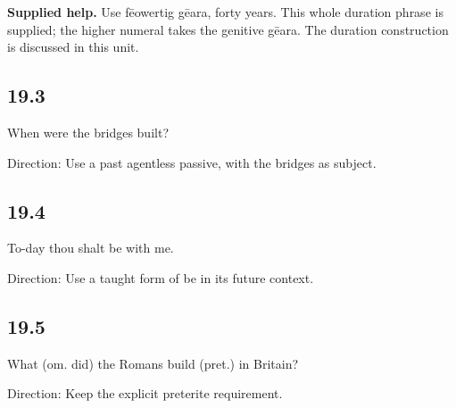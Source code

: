 \textbf{Supplied help.} Use fēowertig gēara, forty years. This whole duration phrase is supplied; the higher numeral takes the genitive gēara. The duration construction is discussed in this unit.

\subsection*{19.3}

\par\begin{minipage}{\linewidth}\raggedright
When were the bridges built?

Direction: Use a past agentless passive, with the bridges as subject.

\end{minipage}\par\addvspace{4pt}

\subsection*{19.4}

\par\begin{minipage}{\linewidth}\raggedright
To-day thou shalt be with me.

Direction: Use a taught form of be in its future context.

\end{minipage}\par\addvspace{4pt}

\subsection*{19.5}

\par\begin{minipage}{\linewidth}\raggedright
What (om. did) the Romans build (pret.) in Britain?

Direction: Keep the explicit preterite requirement.

\end{minipage}\par\addvspace{4pt}

